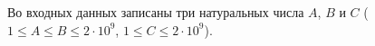 Во входных данных записаны три натуральных числа $A$, $B$ и $C$ ($1 \le A \le B \le 2 \cdot 10^9$, $1 \le C \le 2 \cdot 10^9$).